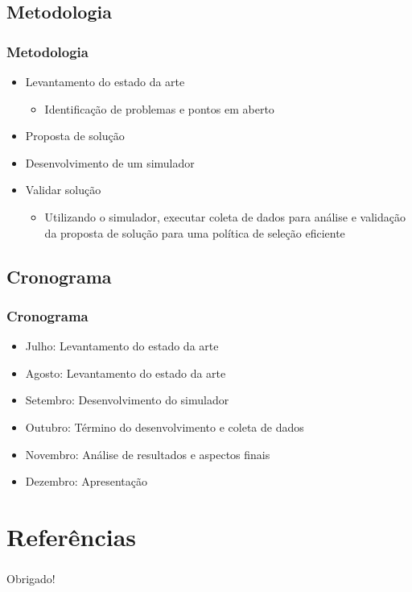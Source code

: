 \documentclass{beamer}
\begin{document}
\subsection{Metodologia}
\begin{frame}
    \frametitle{Metodologia}
    \begin{itemize}
    \pause \item Levantamento do estado da arte
        \begin{itemize}
            \item Identificação de problemas e pontos em aberto
        \end{itemize}
    \pause \item Proposta de solução
    \pause \item Desenvolvimento de um simulador
    \pause \item Validar solução
        \begin{itemize}
            \item Utilizando o simulador, executar coleta de dados para análise
                e validação da proposta de solução para uma política de seleção
        eficiente
        \end{itemize}
    \end{itemize}
\end{frame}


\subsection{Cronograma}
\begin{frame}
    \frametitle{Cronograma}
    \begin{itemize}
        \item Julho: Levantamento do estado da arte
        \item Agosto: Levantamento do estado da arte
        \item Setembro: Desenvolvimento do simulador
        \item Outubro: Término do desenvolvimento e coleta de dados
        \item Novembro: Análise de resultados e aspectos finais
        \item Dezembro: Apresentação
    \end{itemize}
\end{frame}



\nocite{Stevenson09,Cordeiro04,Cormen94,Kurose2005,Stevens94,Tanenbaum03,Zimmermann80,Bae09,Jung08,Park97}

\section{Referências}


\begin{frame}
    \frametitle{ }
    \centerline{Obrigado!}
\end{frame}
\end{document}
